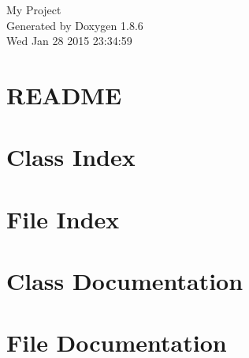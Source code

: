 \documentclass[twoside]{book}
\newcommand{\clearemptydoublepage}{%
  \newpage{\pagestyle{empty}\cleardoublepage}%
}
\begin{document}
\hypersetup{pageanchor=false}
\begin{titlepage}
\vspace*{7cm}
\begin{center}%
{\Large My Project }\\
\vspace*{1cm}
{\large Generated by Doxygen 1.8.6}\\
\vspace*{0.5cm}
{\small Wed Jan 28 2015 23:34:59}\\
\end{center}
\end{titlepage}
\clearemptydoublepage
\tableofcontents
\clearemptydoublepage
{}
\hypersetup{pageanchor=true}

\chapter{R\-E\-A\-D\-M\-E}
\label{md_README}
\hypertarget{md_README}{}

\chapter{Class Index}

\chapter{File Index}

\chapter{Class Documentation}

















\chapter{File Documentation}


















\newpage
{}
{}
\printindex
\end{document}
